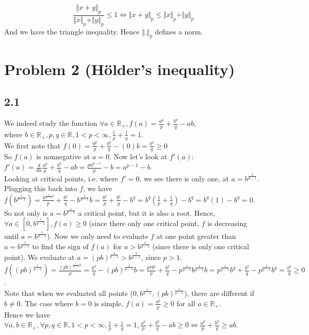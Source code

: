 \documentclass[12pt,a4paper]{article}
\newcommand{\R}{\mathbb{R}}
\theoremstyle{plain}
\theoremstyle{remark}
\theoremstyle{definition}
\begin{document}
$$\frac{\Vert x+y \Vert_p}{\Vert x \Vert_p + \Vert y \Vert_p} \le 1 \Longleftrightarrow \Vert x+y \Vert_p \le \Vert x \Vert_p + \Vert y \Vert_p $$
And we have the triangle inequality. Hence $\Vert . \Vert_p$ defines a norm.

\section*{Problem 2 (H\"{o}lder's inequality)}
\subsection*{2.1}
We indeed study the function $\forall a \in \R_+, f(a) = \frac{a^p}{p} + \frac{b^q}{q} - ab,$\\
where $b \in \R_+, p,q \in \R, 1 < p < \infty, \frac{1}{p} + \frac{1}{q} = 1$.\\
We first note that $f(0) = \frac{0^p}{p} + \frac{b^q}{q} - (0)b = \frac{b^q}{q} \ge 0$\\
So $f(a)$ is nonnegative at $a = 0$. Now let's look at $f'(a)$:\\
$f'(a) = \frac{d}{da} \frac{a^p}{p} + \frac{b^q}{q} - ab = \frac{pa^{p-1}}{p} -b = a^{p-1}-b$.\\
Looking at critical points, i.e. where $f' = 0$, we see there is only one, at $a = b^{\frac{1}{p-1}}$.\\
Plugging this back into $f$, we have\\
$f (b^{\frac{1}{p-1}}) = \frac{b^{\frac{1}{p-1}p}}{p} + \frac{b^q}{q} - b^{\frac{1}{p-1}}b = \frac{b^q}{p} + \frac{b^q}{q} -b^{q} = b^q\left(\frac{1}{p} + \frac{1}{q}\right) - b^q = b^q (1) - b^q = 0$.\\
So not only is $a = b^{\frac{1}{p-1}}$ a critical point, but it is also a root. Hence, $\forall a \in [0,b^{\frac{1}{p-1}}], f(a) \ge 0$ (since there only one critical point, $f$ is decreasing until $a = b^{\frac{1}{p-1}}$). Now we only need to evaluate $f$ at one point greater than $a = b^{\frac{1}{p-1}}$ to find the sign of $f(a)$ for $a> b^{\frac{1}{p-1}}$ (since there is only one critical point). We evaluate at $a = (pb)^{\frac{1}{p-1}} > b^{\frac{1}{p-1}}$, since $p > 1$.\\
$ f((pb)^{\frac{1}{p-1}}) = \frac{(pb)^{\frac{1}{p-1}p}}{p} = \frac{b^q}{q} - (pb)^{\frac{1}{p-1}}b = \frac{p^qb^q}{p} + \frac{b^q}{q} - p^{\frac{1}{p-1}}b^{\frac{1}{p-1}}b = p^\frac{1}{p-1}b^q + \frac{b^q}{q} - p^{\frac{1}{p-1}}b^q = \frac{b^q}{q} \ge 0$.\\
Note that when we evaluated all points ($0,b^{\frac{1}{p-1}}, (pb)^{\frac{1}{p-1}}$), there are different if $b \neq 0$. The case where $b=0$ is simple, $f(a) = \frac{a^p}{p} \ge 0$ for all $a \in \R_+$.\\
Hence we have $\forall a,b\in \R_+, \forall p,q \in \R, 1<p<\infty, \frac{1}{p} + \frac{1}{q} = 1, \frac{a^p}{p} + \frac{b^q}{q} - ab \ge 0 \Longleftrightarrow \frac{a^p}{p} + \frac{b^q}{q} \ge ab$.
\end{document}
